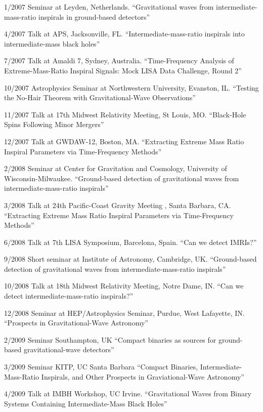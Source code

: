 \documentclass[margin,line]{res}
\begin{document}
\begin{resume}
1/2007 	Seminar at Leyden, Netherlands. 	``Gravitational waves from intermediate-mass-ratio inspirals in ground-based detectors''

4/2007 	Talk 	at APS, Jacksonville, FL. 	``Intermediate-mass-ratio inspirals into intermediate-mass black holes''

7/2007 	Talk 	at Amaldi 7, Sydney, Australia. 	``Time-Frequency Analysis of Extreme-Mass-Ratio Inspiral Signals: Mock LISA Data Challenge, Round 2''

10/2007 	Astrophysics Seminar at Northwestern University, Evanston, IL. 	``Testing the No-Hair Theorem with Gravitational-Wave Observations''

11/2007 	Talk 	at 17th Midwest Relativity Meeting, St Louis, MO. 	``Black-Hole Spins Following Minor Mergers''

12/2007 	Talk 	at GWDAW-12, Boston, MA. 	``Extracting Extreme Mass Ratio Inspiral Parameters via Time-Frequency Methods''

2/2008 	Seminar at Center for Gravitation and Cosmology, University of Wisconsin-Milwaukee. 	``Ground-based detection of gravitational waves from intermediate-mass-ratio inspirals''

3/2008 	Talk at 24th Pacific-Coast Gravity Meeting , Santa Barbara, CA. 	``Extracting Extreme Mass Ratio Inspiral Parameters via Time-Frequency Methods''

6/2008 	Talk at 7th LISA Symposium, Barcelona, Spain. 	``Can we detect IMRIs?''

9/2008 	Short seminar  at Institute of Astronomy, Cambridge, UK. 	``Ground-based detection of gravitational waves from intermediate-mass-ratio inspirals'' 

10/2008 	Talk 	at 18th Midwest Relativity Meeting, Notre Dame, IN. 	``Can we detect intermediate-mass-ratio inspirals?''

12/2008 	Seminar at HEP/Astrophysics Seminar, Purdue, West Lafayette, IN. 	``Prospects in Gravitational-Wave Astronomy'' 


2/2009 	Seminar 	Southampton, UK 	``Compact binaries as sources for ground-based gravitational-wave detectors''

3/2009 	Seminar 	KITP, UC Santa Barbara 	``Compact Binaries, Intermediate-Mass-Ratio Inspirals, and Other Prospects in Graviational-Wave Astronomy''

4/2009 	Talk 	at IMBH Workshop, UC Irvine. 	``Gravitational Waves from Binary Systems Containing Intermediate-Mass Black Holes'' 


\end{resume}
\end{document}
